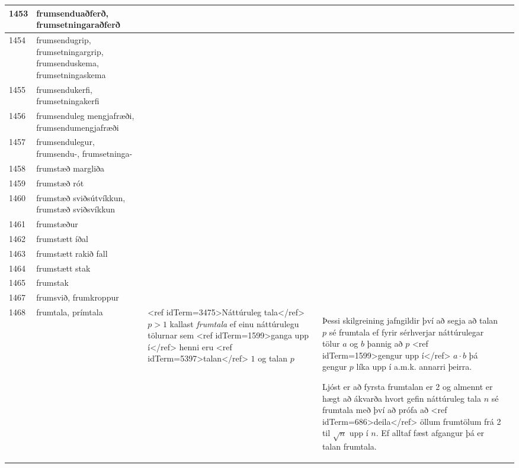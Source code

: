 \begin{longtable}{p{}|p{}|p{}|p{}|p{}}
\hline
1453 & frumsenduaðferð, frumsetningaraðferð &  &  &  \\
\hline
1454 & frumsendugrip, frumsetningargrip, frumsenduskema, frumsetningaskema &  &  &  \\
\hline
1455 & frumsendukerfi, frumsetningakerfi &  &  &  \\
\hline
1456 & frumsenduleg mengjafræði, frumsendumengjafræði &  &  &  \\
\hline
1457 & frumsendulegur, frumsendu-, frumsetninga- &  &  &  \\
\hline
1458 & frumstæð margliða &  &  &  \\
\hline
1459 & frumstæð rót &  &  &  \\
\hline
1460 & frumstæð sviðsútvíkkun, frumstæð sviðsvíkkun &  &  &  \\
\hline
1461 & frumstæður &  &  &  \\
\hline
1462 & frumstætt íðal &  &  &  \\
\hline
1463 & frumstætt rakið fall &  &  &  \\
\hline
1464 & frumstætt stak &  &  &  \\
\hline
1465 & frumstak &  &  &  \\
\hline
1467 & frumsvið, frumkroppur &  &  &  \\
\hline
1468 & frumtala, prímtala & <ref idTerm=3475>Náttúruleg tala</ref> $p > 1$ kallast \textit{frumtala} ef einu náttúrulegu tölurnar sem <ref idTerm=1599>ganga upp í</ref> henni eru <ref idTerm=5397>talan</ref> $1$ og talan $p$ & Þessi skilgreining jafngildir því að segja að talan $p$ sé frumtala ef fyrir sérhverjar náttúrulegar tölur $a$ og $b$ þannig að $p$ <ref idTerm=1599>gengur upp í</ref> $a \cdot b$ þá gengur $p$ líka upp í a.m.k. annarri þeirra.

Ljóst er að fyrsta frumtalan er 2 og almennt er hægt að ákvarða hvort gefin náttúruleg tala $n$ sé frumtala með því að prófa að <ref idTerm=686>deila</ref> öllum frumtölum frá 2 til $\sqrt{n}$ upp í $n$. Ef alltaf fæst afgangur þá er talan frumtala.


\end{longtable}
